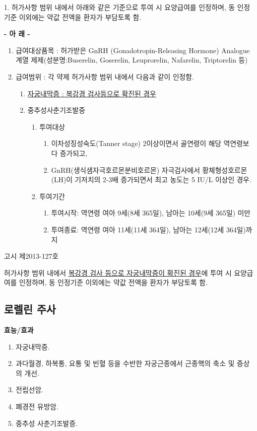 {
\par
1. 허가사항 범위 내에서 아래와 같은 기준으로 투여 시 요양급여를 인정하며, 동 인정기준 이외에는 약값 전액을 환자가 부담토록 함. 
\begin{center}\textbf{- 아 래 -}\end{center}
\begin{enumerate}[가.]\tightlist
\item 급여대상품목 : 허가받은 GnRH (Gonadotropin-Releasing Hormone) Analogue 계열 제제(성분명:Buserelin, Goserelin, Leuprorelin, Nafarelin, Triptorelin 등) 
\item 급여범위 : 각 약제 허가사항 범위 내에서 다음과 같이 인정함. 
	\begin{enumerate}[1)]\tightlist
	\item \uline{자궁내막증 : 복강경 검사등으로 확진된 경우} 
	\item 중추성사춘기조발증 
		\begin{enumerate}[가)]\tightlist
		\item 투여대상 
			\begin{enumerate}[(1)]\tightlist
			\item 이차성징성숙도(Tanner stage) 2이상이면서 골연령이 해당 역연령보다 증가되고, 
			\item GnRH(생식샘자극호르몬분비호르몬) 자극검사에서 황체형성호르몬(LH)이 기저치의 2-3배 증가되면서 최고 농도는 5 IU/L 이상인 경우. 
			\end{enumerate}
		\item 투여기간
			\begin{enumerate}[(1)]\tightlist
			\item 투여시작: 역연령 여아 9세(8세 365일), 남아는 10세(9세 365일) 미만 
			\item 투여종료: 역연령 여아 11세(11세 364일), 남아는 12세(12세 364일)까지 
			\end{enumerate}
		\end{enumerate}
	\end{enumerate}
\end{enumerate}

고시 제2013-127호\par
허가사항 범위 내에서 \uline{복강경 검사 등으로 자궁내막증이 확진된 경우}에 투여 시 요양급여를 인정하며, 동 인정기준 이외에는 약값 전액을 환자가 부담토록 함.
}

\subsection{로렐린 주사}
\textbf{효능/효과}
\begin{enumerate}[1.]\tightlist
\item 자궁내막증. 
\item 과다월경, 하복통, 요통 및 빈혈 등을 수반한 자궁근종에서 근종핵의 축소 및 증상의 개선. 
\item 전립선암. 
\item 폐경전 유방암. 
\item 중추성 사춘기조발증.
\end{enumerate}

